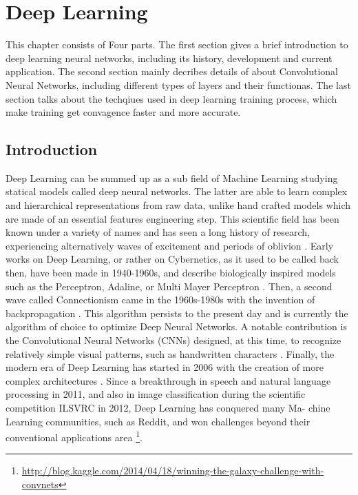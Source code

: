\chapter{Deep Learning}
\label{cp:dp}
This chapter consists of Four parts. The first section gives a brief introduction to deep learning neural networks, including its history, development and current application. The second section mainly decribes details of about Convolutional Neural Networks, including different types of layers and their functionas. The last section talks about the techqiues used in deep learning training process, which make training get convagence faster and more accurate.  

\section{Introduction}
    Deep Learning can be summed up as a sub field of Machine Learning studying statical models called deep neural networks. The latter are able to learn complex and hierarchical representations from raw data, unlike hand crafted models which are made of an essential features engineering step. This scientific field has been known under a variety of names and has seen a long history of research, experiencing alternatively waves of excitement and periods of oblivion \cite{schmidhuber2015deep}. Early works on Deep Learning, or rather on Cybernetics, as it used to be called back then, have been made in 1940-1960s, and describe biologically inspired models such as the Perceptron, Adaline, or Multi Mayer Perceptron \cite{rosenblatt2000probabilistic,schmidhuber2015deep}. Then, a second wave called Connectionism came in the 1960s-1980s with the invention of backpropagation \cite{rumelhart1986learning}. This algorithm persists to the present day and is currently the algorithm of choice to optimize Deep Neural Networks. A notable contribution is the Convolutional Neural Networks (CNNs) designed, at this time, to recognize relatively simple visual patterns, such as handwritten characters \cite{lecun1995convolutional}. Finally, the modern era of Deep Learning has started in 2006 with the creation of more complex architectures \cite{hinton2006fast,bengio2007greedy,huang2007unsupervised}. Since a breakthrough in speech and natural language processing in 2011, and also in image classification during the scientific competition ILSVRC in 2012, Deep Learning has conquered many Ma- chine Learning communities, such as Reddit, and won challenges beyond their conventional applications area \footnote{\url{http://blog.kaggle.com/2014/04/18/winning-the-galaxy-challenge-with-convnets}}. \\

